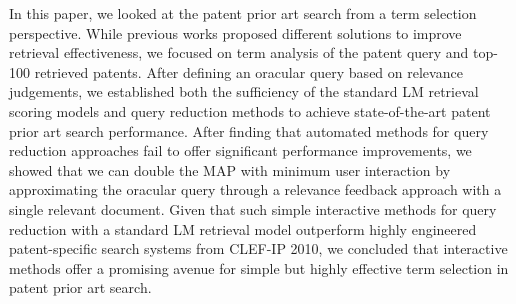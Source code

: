 In this paper, we looked at the patent prior art search from a term
selection perspective.  While previous works proposed different
solutions to improve retrieval effectiveness, we focused on term
analysis of the patent query and top-100 retrieved patents.  After
defining an oracular query based on relevance judgements, we
established both the sufficiency of the standard LM retrieval scoring
models and query reduction methods to achieve state-of-the-art patent
prior art search performance.  After finding that automated methods
for query reduction approaches fail to offer significant performance
improvements,
we showed that we can double the MAP with minimum user interaction by
approximating the oracular query through a relevance feedback approach
with a single relevant document.  Given that such simple interactive
methods for query reduction with a standard LM retrieval model
outperform highly engineered patent-specific search systems from
CLEF-IP 2010, we concluded that interactive methods offer a promising
avenue for simple but highly effective term selection in patent prior
art search.




